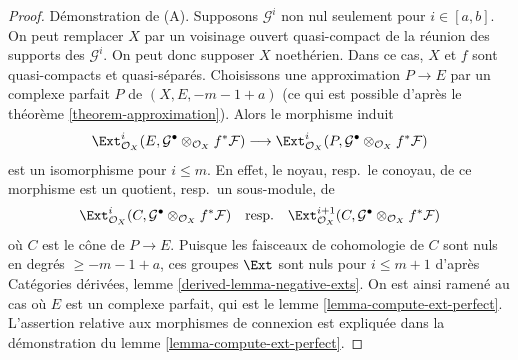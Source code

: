 \begin{proof}
Démonstration de (A).
Supposons $\mathcal{G}^i$ non nul seulement pour $i \in [a, b]$.
On peut remplacer $X$ par un voisinage ouvert quasi-compact de
la réunion des supports des $\mathcal{G}^i$.
On peut donc supposer $X$ noethérien.
Dans ce cas, $X$ et $f$ sont quasi-compacts et quasi-séparés.
Choisissons une approximation $P \to E$ par un complexe parfait $P$ de
$(X, E, -m - 1 + a)$
(ce qui est possible d'après le théorème \ref{theorem-approximation}).
Alors le morphisme induit
$$
\Ext^i_{\mathcal{O}_X}(E,
\mathcal{G}^\bullet \otimes_{\mathcal{O}_X} f^*\mathcal{F})
\longrightarrow
\Ext^i_{\mathcal{O}_X}(P,
\mathcal{G}^\bullet \otimes_{\mathcal{O}_X} f^*\mathcal{F})
$$
est un isomorphisme pour $i \leq m$. En effet, le noyau, resp.\ le conoyau, de ce
morphisme est un quotient, resp.\ un sous-module, de
$$
\Ext^i_{\mathcal{O}_X}(C,
\mathcal{G}^\bullet \otimes_{\mathcal{O}_X} f^*\mathcal{F})
\quad\text{resp.}\quad
\Ext^{i + 1}_{\mathcal{O}_X}(C,
\mathcal{G}^\bullet \otimes_{\mathcal{O}_X} f^*\mathcal{F})
$$
où $C$ est le cône de $P \to E$. Puisque les faisceaux de cohomologie de $C$
sont nuls en degrés $\geq -m - 1 + a$, ces groupes $\Ext$ sont nuls
pour $i \leq m + 1$ d'après
Catégories dérivées, lemme \ref{derived-lemma-negative-exts}.
On est ainsi ramené au cas où
$E$ est un complexe parfait, qui est le lemme \ref{lemma-compute-ext-perfect}.
L'assertion relative aux morphismes de connexion est expliquée dans la démonstration du
lemme \ref{lemma-compute-ext-perfect}.


\end{proof}
